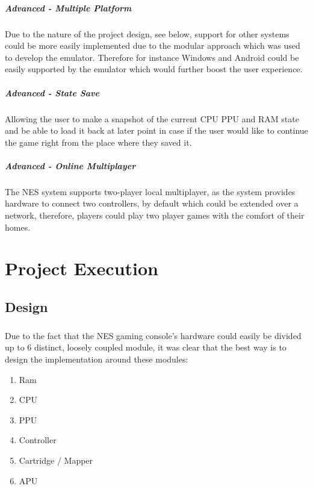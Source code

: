 \documentclass[]{report}
\begin{document}
\paragraph{Advanced - Multiple Platform}
Due to the nature of the project design, see below, support for other systems could be more easily implemented due to the modular approach which was used to develop the emulator. Therefore for instance Windows and Android could be easily supported by the emulator which would further boost the user experience.

\paragraph{Advanced - State Save}
Allowing the user to make a snapshot of the current CPU PPU and RAM state and be able to load it back at later point in case if the user would like to continue the game right from the place where they saved it.

\paragraph{Advanced - Online Multiplayer}
The NES system supports two-player local multiplayer, as the system provides hardware to connect two controllers, by default which could be extended over a network, therefore, players could play two player games with the comfort of their homes.

\chapter{Project Execution}

\section{Design}

\paragraph{ }
Due to the fact that the NES gaming console's hardware could easily be divided up to 6 distinct, loosely coupled module, it was clear that the best way is to design the implementation around these modules:
\begin{enumerate}
	\item Ram
	\item CPU
	\item PPU
	\item Controller
	\item Cartridge / Mapper
	\item APU
\end{enumerate}
\end{document}
